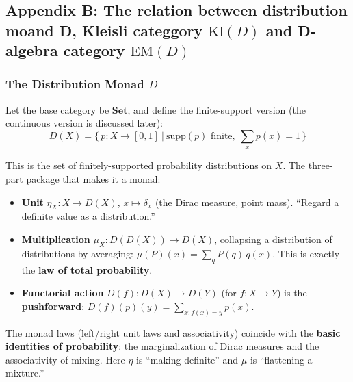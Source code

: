 \documentclass[a4paper,11pt]{article}
\begin{document}
\hypertarget{appendix-b-the-relation-between-distribution-moand-d-kleisli-categgory-mathrmkld-and-d-algebra-category-mathrmemd}{%
\subsection{\texorpdfstring{Appendix B: The relation between distribution moand D, Kleisli categgory \(\mathrm{Kl}(D)\) and D-algebra category
\(\mathrm{EM}(D)\)}{Appendix B: The relation between distribution moand D, Kleisli categgory \textbackslash mathrm\{Kl\}(D) and D-algebra category \textbackslash mathrm\{EM\}(D)}}\label{appendix-b-the-relation-between-distribution-moand-d-kleisli-categgory-mathrmkld-and-d-algebra-category-mathrmemd}}

\hypertarget{the-distribution-monad-d}{%
\subsubsection{\texorpdfstring{The Distribution Monad \(D\)}{The Distribution Monad D}}\label{the-distribution-monad-d}}

Let the base category be \(\mathbf{Set}\), and define the finite-support version (the continuous version is discussed later):
\[D(X)=\Big\{\,p:X\to[0,1]\ \Big|\ \mathrm{supp}(p)\text{ finite},\ \textstyle\sum_{x}p(x)=1\,\Big\}\]

This is the set of finitely-supported probability distributions on \(X\). The three-part package that makes it a monad:

\begin{itemize}
\item
  \textbf{Unit} \(\eta_X:X\to D(X)\), \(x\mapsto \delta_x\) (the Dirac measure, point mass). ``Regard a definite value as a distribution.''
\item
  \textbf{Multiplication} \(\mu_X:D(D(X))\to D(X)\), collapsing a distribution of distributions by averaging:
  \(\mu(P)(x)=\sum_{q}P(q)\,q(x)\). This is exactly the \textbf{law of total probability}.
\item
  \textbf{Functorial action} \(D(f):D(X)\to D(Y)\) (for \(f:X\to Y\)) is the \textbf{pushforward}: \(D(f)(p)(y)=\sum_{x:f(x)=y}p(x)\).
\end{itemize}

The monad laws (left/right unit laws and associativity) coincide with the \textbf{basic identities of probability}: the marginalization of
Dirac measures and the associativity of mixing. Here \(\eta\) is ``making definite'' and \(\mu\) is ``flattening a mixture.''
\end{document}
